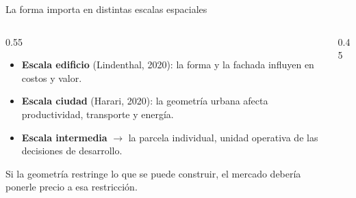 \documentclass[11pt,aspectratio=169]{beamer}
\begin{document}
\begin{frame}{La forma importa en distintas escalas espaciales}
  \begin{columns}[T]
    \begin{column}{0.55\textwidth}
      \begin{itemize}
        \item \textbf{Escala edificio} (Lindenthal, 2020): la forma y la fachada influyen en costos y valor.
        \item \textbf{Escala ciudad} (Harari, 2020): la geometría urbana afecta productividad, transporte y energía.
        \item \textbf{Escala intermedia} $\rightarrow$ la \alert{parcela individual}, unidad operativa de las decisiones de desarrollo.
      \end{itemize}
      \vspace{0.6em}
      Si la geometría restringe lo que se puede construir, el mercado debería \alert{ponerle precio} a esa restricción.
    \end{column}
    \begin{column}{0.45\textwidth}
      \centering
    \end{column}
  \end{columns}
\end{frame}
\end{document}
